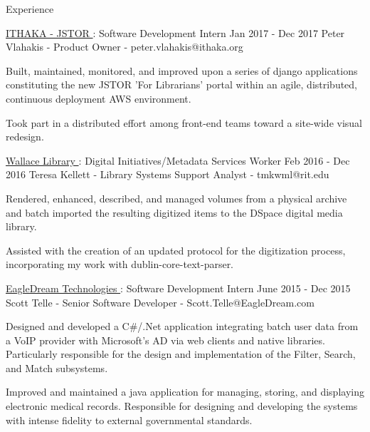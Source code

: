 \documentclass{resume} %
\begin{document}
  \begin{rSection}{Experience}

    \begin{rSubsection}{\underline{ITHAKA - JSTOR }: Software Development Intern }{ Jan 2017 - Dec 2017 }{ Peter Vlahakis - Product Owner - peter.vlahakis@ithaka.org }

      \item Built, maintained, monitored, and improved upon a series of django applications constituting the new JSTOR 'For Librarians' portal within an agile, distributed, continuous deployment AWS environment.

      \item Took part in a distributed effort among front-end teams toward a site-wide visual redesign.

    \end{rSubsection}

    \begin{rSubsection}{\underline{Wallace Library }: Digital Initiatives/Metadata Services Worker }{ Feb 2016 - Dec 2016 }{ Teresa Kellett - Library Systems Support Analyst - tmkwml@rit.edu }

      \item Rendered, enhanced, described, and managed volumes from a physical archive and batch imported the resulting digitized items to the DSpace digital media library.

      \item Assisted with the creation of an updated protocol for the digitization process, incorporating my work with dublin-core-text-parser.

    \end{rSubsection}

    \begin{rSubsection}{\underline{EagleDream Technologies }: Software Development Intern }{ June 2015 - Dec 2015 }{ Scott Telle - Senior Software Developer - Scott.Telle@EagleDream.com }

      \item Designed and developed a C\#/.Net application integrating batch user data from a VoIP provider with Microsoft’s AD via web clients and native libraries. Particularly responsible for the design and implementation of the Filter, Search, and Match subsystems.

      \item Improved and maintained a java application for managing, storing, and displaying electronic medical records. Responsible for designing and developing the systems with intense fidelity to external governmental standards.

    \end{rSubsection}

  \end{rSection}
\end{document}

